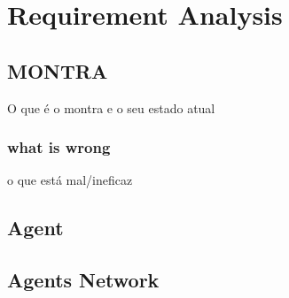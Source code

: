 \chapter{Requirement Analysis}
\label{chapter:requirement-analysis}

\section{MONTRA}
O que é o montra e o seu estado atual

\subsection{what is wrong}
o que está mal/ineficaz

\section{Agent}

\section{Agents Network}
